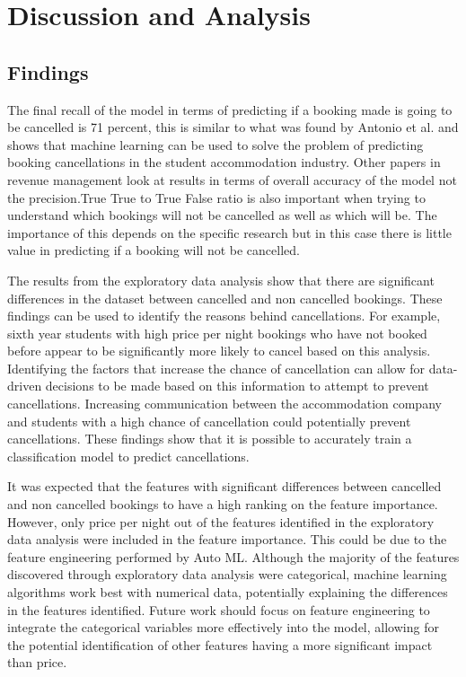 \chapter{Discussion and Analysis}

\section{Findings}
The final recall of the model in terms of predicting if a booking made is going to be cancelled is 71 percent, this is similar to what was found by Antonio et al.  and shows that machine learning can be used to solve the problem of predicting booking cancellations in the student accommodation industry. Other papers in revenue management look at results in terms of overall accuracy \cite{Antonio2017PredictingRevenue} of the model not the precision.True True to True False ratio is also important when trying to understand which bookings will not be cancelled as well as which will be. The importance of this depends on the specific research but in this case there is little value in predicting if a booking will not be cancelled.

\vspace{5mm}

The results from the exploratory data analysis show that there are significant differences in the dataset between cancelled and non cancelled bookings. These findings can be used to identify the reasons behind cancellations. For example, sixth year students with high price per night bookings who have not booked before appear to be significantly more likely to cancel based on this analysis. Identifying the factors that increase the chance of cancellation can allow for data-driven decisions to be made based on this information to attempt to prevent cancellations. Increasing communication between the accommodation company and students with a high chance of cancellation could potentially prevent cancellations. These findings show that it is possible to accurately train a classification model to predict cancellations. 

\vspace{5mm}

It was expected that the features with significant differences between cancelled and non cancelled bookings to have a high ranking on the feature importance. However, only price per night out of the features identified in the exploratory data analysis were included in the feature importance. This could be due to the feature engineering performed by Auto ML. Although the majority of the features discovered through exploratory data analysis were categorical, machine learning algorithms work best with numerical data, potentially explaining the differences in the features identified. Future work should focus on feature engineering to integrate the categorical variables more effectively into the model, allowing for the potential identification of other features having a more significant impact than price. 

